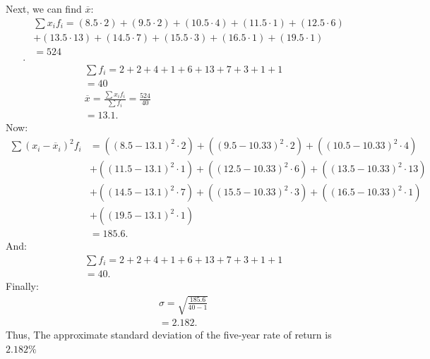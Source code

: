 \documentclass{report}
\begin{document}
\begin{mdframed}
\begin{center}
\begin{tabular}{|c|c|c|c|}
                    \end{tabular}
           \end{center}
           \bigbreak \noindent 
           Next, we can find $\overline{x} $:
           \begin{align*}
               &\sum x_{i}f_{i} =  (8.5\cdot 2) + (9.5\cdot 2) + (10.5 \cdot 4) + (11.5 \cdot 1) + (12.5 \cdot 6) \\
               &+ (13.5\cdot 13) + (14.5\cdot 7) + (15.5\cdot 3) + (16.5\cdot 1) + (19.5\cdot 1) \\
               &=524 \\
           .\end{align*}
           \begin{align*}
               \sum f_{i} = 2+2+4+1+6+13+7+3+1+1 \\
               = 40 \\
               \overline{x} = \frac{\sum x_{i}f_{i}}{\sum f_{i}} = \frac{524}{40} \\ = 13.1
           .\end{align*}
           \bigbreak \noindent 
           Now:
           \begin{align*}
               \sum (x_{i} - \overline{x}_{i})^{2}f_{i} &= ((8.5 - 13.1)^{2}\cdot 2) + ((9.5 - 10.33)^{2} \cdot 2) + ((10.5-10.33)^{2}\cdot 4) \\
                                               & +((11.5-13.1)^{2}\cdot 1) + ((12.5-10.33)^{2}\cdot 6) + ((13.5-10.33)^{2}\cdot 13) \\
                                               &+((14.5-13.1)^{2}\cdot 7) + ((15.5-10.33)^{2}\cdot 3) + ((16.5-10.33)^{2}\cdot 1) \\
                                               &+ ((19.5-13.1)^{2}\cdot 1) \\
                                               &= 185.6
           .\end{align*}
           And:
           \begin{align*}
               \sum f_{i} = 2+2+4+1+6+13+7+3+1+1 \\
               =40 
           .\end{align*}
           \bigbreak \noindent 
           Finally:
           \begin{align*}
               \sigma = \sqrt{\frac{185.6}{40-1}} \\
               =2.182
           .\end{align*}
           \bigbreak \noindent 
           Thus, The approximate standard deviation of the five-year rate of return is $2.182\% $
         \end{mdframed}
\end{document}
